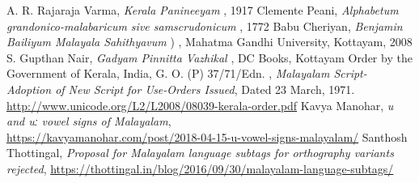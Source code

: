 \documentclass[10pt]{article}
\begin{document}
\begin{thebibliography}{9}
	
 A. R. Rajaraja Varma, \textit{Kerala Panineeyam} { }, 1917
 Clemente Peani, \textit{Alphabetum grandonico-malabaricum sive samscrudonicum} , 1772
 Babu Cheriyan, \textit{Benjamin Bailiyum Malayala Sahithyavum} {) }, Mahatma Gandhi University, Kottayam, 2008
 S. Gupthan Nair, \textit{Gadyam Pinnitta Vazhikal}{ }, DC Books, Kottayam
 Order by the Government of Kerala, India, G. O. (P) 37/71/Edn. , \textit{Malayalam Script- Adoption of New Script for Use-Orders Issued}, Dated 23 March, 1971. \url{http://www.unicode.org/L2/L2008/08039-kerala-order.pdf}
 Kavya Manohar, \textit{u and uː vowel signs of Malayalam},\\ \url{https://kavyamanohar.com/post/2018-04-15-u-vowel-signs-malayalam/}
Santhosh Thottingal, \textit{Proposal for Malayalam language subtags for orthography variants rejected}, \url{https://thottingal.in/blog/2016/09/30/malayalam-language-subtags/}

\end{thebibliography}
\end{document}
